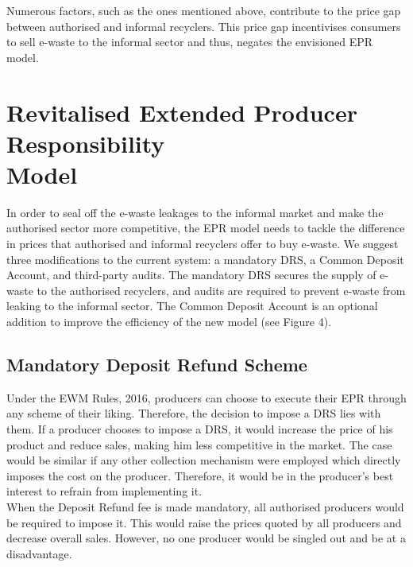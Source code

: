 \documentclass[a4paper, 12pt]{article}
\begin{document}
                    Numerous factors, such as the ones mentioned above, contribute to the price gap between authorised and informal recyclers. This price gap incentivises consumers to sell e-waste to the informal sector and thus, negates the envisioned EPR model.
 
                    
\section{Revitalised Extended Producer Responsibility \\ Model}\label{sec:4}
                    
                    In order to seal off the e-waste leakages to the informal market and make the authorised sector more competitive, the EPR model needs to tackle the difference in prices that authorised and informal recyclers offer to buy e-waste. We suggest three modifications to the current system: a mandatory DRS, a Common Deposit Account, and third-party audits. The mandatory DRS secures the supply of e-waste to the authorised recyclers, and audits are required to prevent e-waste from leaking to the informal sector. The Common Deposit Account is an optional addition to improve the efficiency of the new model (see Figure 4). 
                    
\subsection{Mandatory Deposit Refund Scheme}
                    
                    Under the EWM Rules, 2016, producers can choose to execute their EPR through any scheme of their liking. Therefore, the decision to impose a DRS lies with them. If a producer chooses to impose a DRS, it would increase the price of his product and reduce sales, making him less competitive in the market. The case would be similar if any other collection mechanism were employed which directly imposes the cost on the producer. Therefore, it would be in the producer’s best interest to refrain from implementing it. \\
                    
                    When the Deposit Refund fee is made mandatory, all authorised producers would be required to impose it. This would raise the prices quoted by all producers and decrease overall sales. However, no one producer would be singled out and be at a disadvantage.\\
                      
\end{document}
